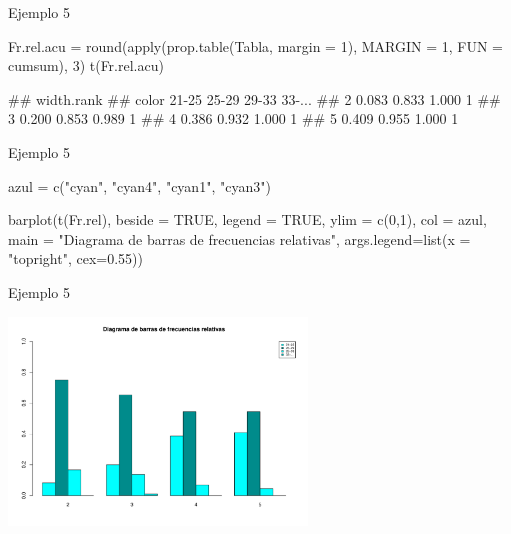 \documentclass[
  ignorenonframetext,
  aspectratio=169]{beamer}
\newenvironment{Shaded}{\begin{snugshade}}{\end{snugshade}}
\newcommand{\AttributeTok}[1]{\textcolor[rgb]{0.77,0.63,0.00}{#1}}
\newcommand{\ConstantTok}[1]{\textcolor[rgb]{0.00,0.00,0.00}{#1}}
\newcommand{\DecValTok}[1]{\textcolor[rgb]{0.00,0.00,0.81}{#1}}
\newcommand{\FloatTok}[1]{\textcolor[rgb]{0.00,0.00,0.81}{#1}}
\newcommand{\FunctionTok}[1]{\textcolor[rgb]{0.00,0.00,0.00}{#1}}
\newcommand{\NormalTok}[1]{#1}
\newcommand{\OtherTok}[1]{\textcolor[rgb]{0.56,0.35,0.01}{#1}}
\newcommand{\StringTok}[1]{\textcolor[rgb]{0.31,0.60,0.02}{#1}}
\let\oldverbatim\verbatim
\let\endoldverbatim\endverbatim
\renewenvironment{verbatim}{\tiny\oldverbatim}{\endoldverbatim}
\begin{document}
\begin{frame}[fragile]{Ejemplo 5}
\protect\hypertarget{ejemplo-5-6}{}
\begin{Shaded}
\begin{Highlighting}[]
\NormalTok{Fr.rel.acu }\OtherTok{=} \FunctionTok{round}\NormalTok{(}\FunctionTok{apply}\NormalTok{(}\FunctionTok{prop.table}\NormalTok{(Tabla, }\AttributeTok{margin =} \DecValTok{1}\NormalTok{), }
                         \AttributeTok{MARGIN =} \DecValTok{1}\NormalTok{, }\AttributeTok{FUN =}\NormalTok{ cumsum), }\DecValTok{3}\NormalTok{)}
\FunctionTok{t}\NormalTok{(Fr.rel.acu)}
\end{Highlighting}
\end{Shaded}

\begin{verbatim}
##      width.rank
## color 21-25 25-29 29-33 33-...
##     2 0.083 0.833 1.000      1
##     3 0.200 0.853 0.989      1
##     4 0.386 0.932 1.000      1
##     5 0.409 0.955 1.000      1
\end{verbatim}
\end{frame}

\begin{frame}[fragile]{Ejemplo 5}
\protect\hypertarget{ejemplo-5-7}{}
\begin{Shaded}
\begin{Highlighting}[]
\NormalTok{azul }\OtherTok{=} \FunctionTok{c}\NormalTok{(}\StringTok{"cyan"}\NormalTok{, }\StringTok{"cyan4"}\NormalTok{, }\StringTok{"cyan1"}\NormalTok{, }\StringTok{"cyan3"}\NormalTok{)}

\FunctionTok{barplot}\NormalTok{(}\FunctionTok{t}\NormalTok{(Fr.rel), }\AttributeTok{beside =} \ConstantTok{TRUE}\NormalTok{, }\AttributeTok{legend =} \ConstantTok{TRUE}\NormalTok{, }\AttributeTok{ylim =} \FunctionTok{c}\NormalTok{(}\DecValTok{0}\NormalTok{,}\DecValTok{1}\NormalTok{), }\AttributeTok{col =}\NormalTok{ azul, }
        \AttributeTok{main =} \StringTok{"Diagrama de barras de frecuencias relativas"}\NormalTok{, }
        \AttributeTok{args.legend=}\FunctionTok{list}\NormalTok{(}\AttributeTok{x =} \StringTok{"topright"}\NormalTok{, }\AttributeTok{cex=}\FloatTok{0.55}\NormalTok{))}
\end{Highlighting}
\end{Shaded}
\end{frame}

\begin{frame}{Ejemplo 5}
\protect\hypertarget{ejemplo-5-8}{}
\begin{center}\includegraphics[width=300px]{Hora4_files/figure-beamer/unnamed-chunk-28-1} \end{center}
\end{frame}
\end{document}
